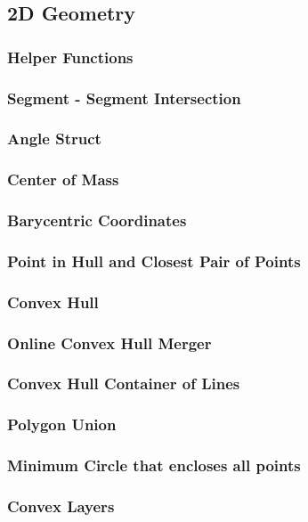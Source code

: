 \subsection{2D Geometry}
\subsubsection{Helper Functions}
\subsubsection{Segment - Segment Intersection}
\subsubsection{Angle Struct}
\subsubsection{Center of Mass}
\subsubsection{Barycentric Coordinates}
\subsubsection{Point in Hull and Closest Pair of Points}
\subsubsection{Convex Hull}
\subsubsection{Online Convex Hull Merger}
\subsubsection{Convex Hull Container of Lines}
\subsubsection{Polygon Union}
\subsubsection{Minimum Circle that encloses all points}
\subsubsection{Convex Layers}

